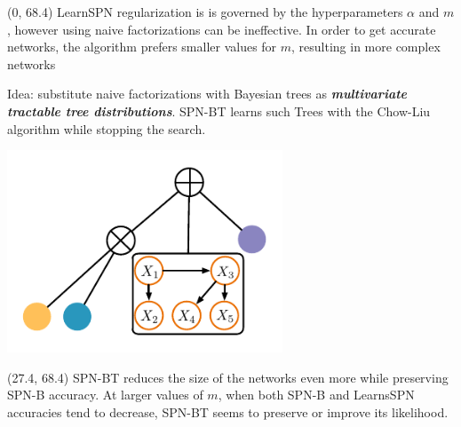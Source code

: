 \documentclass[final]{beamer}
\begin{document}
\begin{frame}{}
  \begin{textblock}{25.2}(0, 68.4)
    \footnotesize
    LearnSPN regularization is is governed by the hyperparameters $\alpha$ and $m$,
    however using naive factorizations can be ineffective. In order to
    get accurate networks, the algorithm prefers smaller values for
    $m$, resulting in more complex networks\par\bigskip

    Idea: substitute naive factorizations with Bayesian trees as
    \emph{\textbf{multivariate tractable tree
        distributions}}. \textsf{SPN-BT} learns such \textsf{T}rees
    with the Chow-Liu algorithm while stopping the search.\par\bigskip

    \hspace{40pt}\begin{minipage}[c]{0.3\linewidth}
      \hspace{-30pt}
        \includegraphics[width=8.2cm]{figures/spn-clt}
    \end{minipage}
    
  \end{textblock}
  
  \begin{textblock}{25.2}(27.4, 68.4)
    \footnotesize
    \textsf{SPN-BT} reduces the
    size of the networks even more while preserving \textsf{SPN-B}
    accuracy. At larger values of $m$, when both SPN-B and LearnsSPN
    accuracies tend to decrease, \textsf{SPN-BT} seems to preserve or
    improve its likelihood.
    

\end{textblock}
\end{frame}
\end{document}
